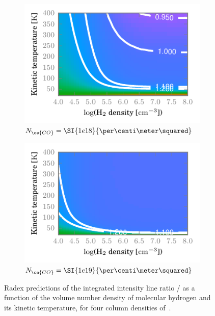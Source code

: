 \begin{figure}
\begin{subfigure}[b]{0.5\textwidth}
    \end{subfigure}%
    \\
    \begin{subfigure}[b]{0.5\textwidth}
        \includegraphics[width=\textwidth]{contour_87_98_e18}
        \caption{$N_\ce{CO} = \SI{1e18}{\per\centi\meter\squared}$}
    \end{subfigure}%
    \hfill
    \begin{subfigure}[b]{0.5\textwidth}
        \includegraphics[width=\textwidth]{contour_87_98_e19}
        \caption{$N_\ce{CO} = \SI{1e19}{\per\centi\meter\squared}$}
    \end{subfigure}%
    \caption{Radex predictions of the integrated intensity line ratio / as a function of the volume number density of molecular hydrogen and its kinetic temperature, for four column densities of~.}
    \label{fig:contour_87_98}
\end{figure}








